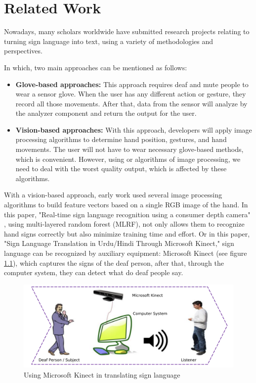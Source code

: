 \chapter{Related Work}

Nowadays, many scholars worldwide have submitted research projects relating to turning sign language into text, using a variety of methodologies and perspectives.

In which, two main approaches can be mentioned as follows:
\begin{itemize}
  \item \textbf{Glove-based approaches:} This approach requires deaf and mute people to wear a sensor glove. When the user has any different action or gesture, they record all those movements. After that, data from the sensor will analyze by the analyzer component and return the output for the user.
  \item \textbf{Vision-based approaches:} With this approach, developers will apply image processing algorithms to determine hand position, gestures, and hand movements. The user will not have to wear necessary glove-based methods, which is convenient. However, using or algorithms of image processing, we need to deal with the worst quality output, which is affected by these algorithms.
\end{itemize}

With a vision-based approach, early work used several image processing algorithms to build feature vectors based on a single RGB image of the hand. In this paper, "Real-time sign language recognition using a consumer depth camera" \cite{kuznetsova2013real}, using multi-layered random forest (MLRF), not only allows them to recognize hand signs correctly but also minimize training time and effort. Or in this paper, "Sign Language Translation in Urdu/Hindi Through Microsoft Kinect," sign language can be recognized by auxiliary equipment: Microsoft Kinect (see figure \ref{fig:Chap2-MS-Kinect}), which captures the signs of the deaf person, after that, through the computer system, they can detect what do deaf people say.

\begin{figure}[H]
  \centering
  \includegraphics[width=\textwidth]{img/Chap2/MS-Kinect.png}
  \caption{Using Microsoft Kinect in translating sign language}
  \label{fig:Chap2-MS-Kinect}
\end{figure}

